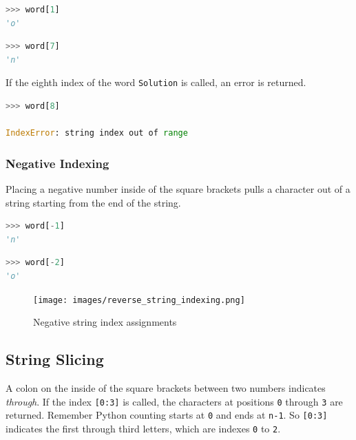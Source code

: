 \documentclass{book}
\begin{document}
    
        \begin{lstlisting}[language=Python]
>>> word[1]
'o'
\end{lstlisting}
    




    
        \begin{lstlisting}[language=Python]
>>> word[7]
'n'
\end{lstlisting}
    




    
        If the eighth index of the word \lstinline!Solution! is called, an error
is returned.

\begin{lstlisting}[language=Python]
>>> word[8]

IndexError: string index out of range
\end{lstlisting}
    




    
        \subsubsection{Negative Indexing}\label{negative-indexing}

Placing a negative number inside of the square brackets pulls a
character out of a string starting from the end of the string.

\begin{lstlisting}[language=Python]
>>> word[-1]
'n'
\end{lstlisting}

\begin{lstlisting}[language=Python]
>>> word[-2]
'o'
\end{lstlisting}

\begin{figure}
\centering
\texttt{[image: images/reverse\_string\_indexing.png]}
\caption{Negative string index assignments}
\end{figure}
    




    
        \subsection{String Slicing}\label{string-slicing}

A colon on the inside of the square brackets between two numbers
indicates \emph{through}. If the index \lstinline![0:3]! is called, the
characters at positions \lstinline!0! through \lstinline!3! are
returned. Remember Python counting starts at \lstinline!0! and ends at
\lstinline!n-1!. So \lstinline![0:3]! indicates the first through third
letters, which are indexes \lstinline!0! to \lstinline!2!.
\end{document}
